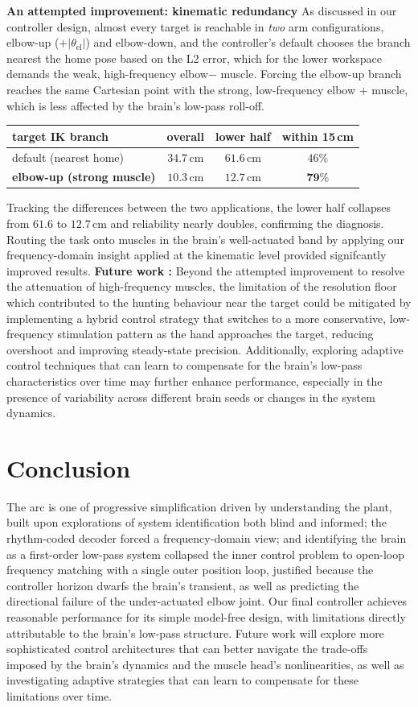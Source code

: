 \documentclass[11pt]{article}
\begin{document}
\textbf{An attempted improvement: kinematic redundancy} As discussed in our controller design, almost every target is reachable in
\emph{two} arm configurations, elbow-up ($+|\theta_{\mathrm{el}}|$) and elbow-down, and
the controller's default chooses the branch nearest the home pose based on the L2 error, which for the lower
workspace demands the weak, high-frequency elbow$-$ muscle. Forcing the elbow-up
branch reaches the same Cartesian point with the strong, low-frequency elbow + muscle, which is less affected by the brain's low-pass roll-off. 
\begin{center}\small
\begin{tabular}{lccc}
\toprule
target IK branch & overall & lower half & within 15\,cm \\
\midrule
default (nearest home) & $34.7$\,cm & $61.6$\,cm & $46\%$ \\
\textbf{elbow-up (strong muscle)} & $\mathbf{10.3}$\,cm & $\mathbf{12.7}$\,cm & $\mathbf{79\%}$ \\
\bottomrule
\end{tabular}
\end{center}
Tracking the differences between the two applications, the lower half collapses from $61.6$ to $12.7$\,cm and reliability nearly doubles,
confirming the diagnosis. Routing the task onto muscles in the brain's well-actuated band by applying our frequency-domain insight applied
at the kinematic level provided signifcantly improved results.
\textbf{Future work :} Beyond the attempted improvement to resolve the attenuation of high-frequency muscles, the limitation of the resolution floor which contributed 
to the hunting behaviour near the target could be mitigated by implementing a hybrid control strategy that switches to a more conservative, low-frequency stimulation pattern as the hand approaches the target, reducing overshoot and improving steady-state precision. 
Additionally, exploring adaptive control techniques that can learn to compensate for the brain's low-pass characteristics over time may further enhance performance, especially in the presence of variability across different brain seeds or changes in the system dynamics.
\section{Conclusion}
The arc is one of progressive simplification driven by understanding the plant, built upon explorations of
system identification both blind and informed; the rhythm-coded decoder forced a frequency-domain view; and identifying the
brain as a first-order low-pass system collapsed the inner control problem to open-loop
frequency matching with a single outer position loop, justified because the controller
horizon dwarfs the brain's transient, as well as predicting the directional failure of the under-actuated elbow joint.
Our final controller achieves reasonable performance for its simple model-free design, with limitations directly attributable to the brain's low-pass structure.
Future work will explore more sophisticated control architectures that can better navigate the trade-offs imposed by the brain's dynamics and the muscle head's nonlinearities, as well as investigating adaptive strategies that can learn to compensate for these limitations over time.
\end{document}
